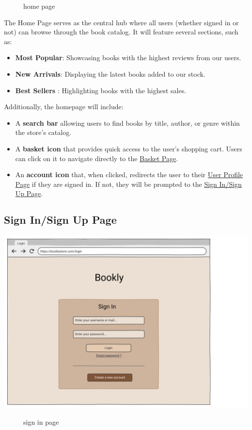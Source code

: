 \begin{figure}[h!]
    \centering
    \caption{home page}
    \label{fig:enter-label}
\end{figure}
The Home Page serves as the central hub where all users (whether signed in or not) can browse through the book catalog. It will feature several sections, such as:
\begin{itemize}
    \item \textbf{Most Popular}: Showcasing books with the highest reviews from our users.
    \item \textbf{New Arrivals}: Displaying the latest books added to our stock.
    \item \textbf{Best Sellers} : Highlighting books with the highest sales.
\end{itemize}
Additionally, the homepage will include:
\begin{itemize}
    \item A \textbf{search bar} allowing users to find books by title, author, or genre within the store's catalog.
    \item A \textbf{basket icon} that provides quick access to the user's shopping cart. Users can click on it to navigate directly to the \hyperref[sec:basket]{Basket Page}.
    \item An \textbf{account icon} that, when clicked, redirects the user to their \hyperref[sec:profile]{User Profile Page} if they are signed in. If not, they will be prompted to the \hyperref[sec:signin]{Sign In/Sign Up Page}.
\end{itemize}


\subsection{Sign In/Sign Up Page} 
\includegraphics[width=0.6\linewidth]{HW1Report/photos/signin.png}

\begin{figure}[h!]
    \centering
    \caption{sign in page}
    \label{fig:enter-label}
\end{figure}

